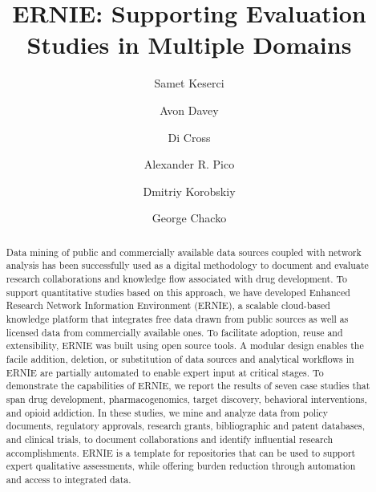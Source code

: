\documentclass[review]{elsarticle}
\begin{document}
\begin{frontmatter}

\title{ERNIE: Supporting Evaluation Studies in Multiple Domains} 

\author[nl]{Samet Keserci}
\author[nl]{Avon Davey}
\author[ca]{Di Cross}
\author[gi]{Alexander R. Pico}
\author[nl]{Dmitriy Korobskiy}
\author[nl]{George Chacko }



\address[nl]{NETE Labs, NET ESolutions Corporation, McLean, VA, USA}
\address[ca]{Research Data Science \& Evaluation, Clarivate Analytics, USA}
\address[gi]{Gladstone Institutes, San Francisco, CA, USA}

\raggedright

\begin{abstract}

Data mining of public and commercially available data sources coupled with network analysis has been successfully used as a digital methodology to document and evaluate research collaborations and knowledge flow associated with drug development. To support quantitative studies based on this approach, we have developed Enhanced Research Network Information Environment (ERNIE), a scalable cloud-based knowledge platform that integrates free data drawn from public sources as well as licensed data from commercially available ones. To facilitate adoption, reuse and extensibility, ERNIE was built using open source tools. A modular design enables the facile addition, deletion, or substitution of data sources and analytical workflows in ERNIE are partially automated to enable expert input at critical stages. To demonstrate the capabilities of ERNIE, we report the results of seven case studies that span drug development, pharmacogenomics, target discovery, behavioral interventions, and opioid addiction. In these studies, we mine and analyze data from policy documents, regulatory approvals, research grants, bibliographic and patent databases, and clinical trials, to document collaborations and identify influential research accomplishments. ERNIE is a template for repositories that can be used to support expert qualitative assessments, while offering burden reduction through automation and access to integrated data.

\end{abstract}


\end{frontmatter}       
\end{document}
